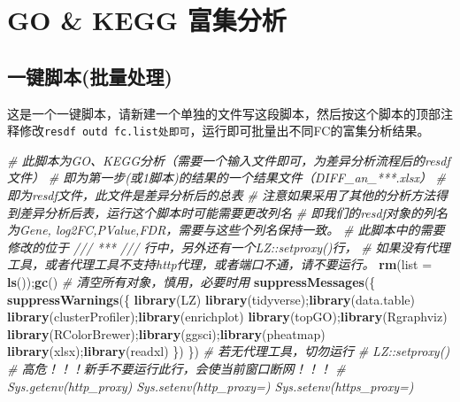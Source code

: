 \documentclass[
]{book}
\newenvironment{Shaded}{\begin{snugshade}}{\end{snugshade}}
\newcommand{\AttributeTok}[1]{\textcolor[rgb]{0.13,0.29,0.53}{#1}}
\newcommand{\CommentTok}[1]{\textcolor[rgb]{0.56,0.35,0.01}{\textit{#1}}}
\newcommand{\FunctionTok}[1]{\textcolor[rgb]{0.13,0.29,0.53}{\textbf{#1}}}
\newcommand{\NormalTok}[1]{#1}
\begin{document}
\hypertarget{enrich-auto}{%
\section{GO \& KEGG 富集分析}\label{enrich-auto}}

\hypertarget{ux4e00ux952eux811aux672cux6279ux91cfux5904ux7406}{%
\subsection{一键脚本(批量处理)}\label{ux4e00ux952eux811aux672cux6279ux91cfux5904ux7406}}

这是一个一键脚本，请新建一个单独的文件写这段脚本，然后按这个脚本的顶部注释修改\texttt{resdf\ outd\ fc.list处即可}，运行即可批量出不同FC的富集分析结果。

\begin{Shaded}
\begin{Highlighting}[]
\CommentTok{\# 此脚本为GO、KEGG分析（需要一个输入文件即可，为差异分析流程后的resdf文件）}
\CommentTok{\# 即为第一步(或1脚本)的结果的一个结果文件（DIFF\_an\_***.xlsx）}
\CommentTok{\# 即为resdf文件，此文件是差异分析后的总表}
\CommentTok{\# 注意如果采用了其他的分析方法得到差异分析后表，运行这个脚本时可能需要更改列名}
\CommentTok{\# 即我们的resdf对象的列名为Gene, log2FC,PValue,FDR，需要与这些个列名保持一致。}
\CommentTok{\# 此脚本中的需要修改的位于 /// *** /// 行中，另外还有一个LZ::setproxy()行，}
\CommentTok{\#   如果没有代理工具，或者代理工具不支持http代理，或者端口不通，请不要运行。}
\FunctionTok{rm}\NormalTok{(}\AttributeTok{list =} \FunctionTok{ls}\NormalTok{());}\FunctionTok{gc}\NormalTok{() }\CommentTok{\# 清空所有对象，慎用，必要时用}
\FunctionTok{suppressMessages}\NormalTok{(\{ }\FunctionTok{suppressWarnings}\NormalTok{(\{}
  \FunctionTok{library}\NormalTok{(LZ)}
  \FunctionTok{library}\NormalTok{(tidyverse);}\FunctionTok{library}\NormalTok{(data.table)}
  \FunctionTok{library}\NormalTok{(clusterProfiler);}\FunctionTok{library}\NormalTok{(enrichplot)}
  \FunctionTok{library}\NormalTok{(topGO);}\FunctionTok{library}\NormalTok{(Rgraphviz)}
  \FunctionTok{library}\NormalTok{(RColorBrewer);}\FunctionTok{library}\NormalTok{(ggsci);}\FunctionTok{library}\NormalTok{(pheatmap)}
  \FunctionTok{library}\NormalTok{(xlsx);}\FunctionTok{library}\NormalTok{(readxl)}
\NormalTok{\}) \})}
\CommentTok{\# 若无代理工具，切勿运行 }
\CommentTok{\# LZ::setproxy() \# 高危！！！新手不要运行此行，会使当前窗口断网！！！}
\CommentTok{\# Sys.getenv(\textquotesingle{}http\_proxy\textquotesingle{}) Sys.setenv(\textquotesingle{}http\_proxy\textquotesingle{}=\textquotesingle{}\textquotesingle{}) Sys.setenv(\textquotesingle{}https\_proxy\textquotesingle{}=\textquotesingle{}\textquotesingle{})}


\end{Highlighting}
\end{Shaded}
\end{document}
